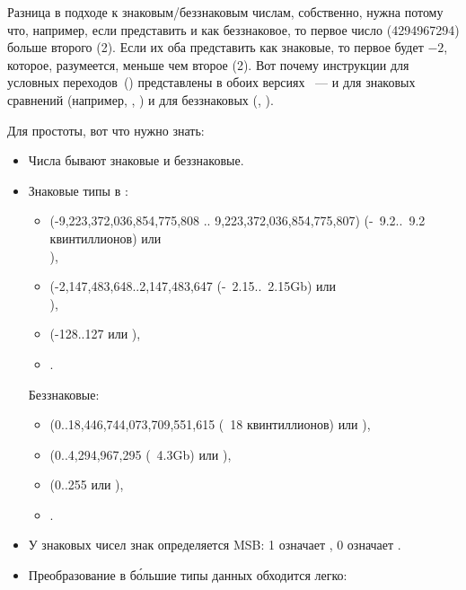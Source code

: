 Разница в подходе к знаковым/беззнаковым числам, собственно, нужна потому что, например, 
если представить  и  как беззнаковое, то первое число (4294967294) больше второго (2). 
Если их оба представить как знаковые, то первое будет $-2$, которое, разумеется, меньше чем второе (2).
Вот почему инструкции для условных переходов~() представлены в обоих версиях ~--- 
и для знаковых сравнений (например, \JG, \JL) и для беззнаковых (\JA, \JB).

Для простоты, вот что нужно знать:

\begin{itemize}
\item Числа бывают знаковые и беззнаковые.

\item Знаковые типы в \CCpp:

  \begin{itemize}
    \item {} (-9,223,372,036,854,775,808 .. 9,223,372,036,854,775,807) 
	  (-~9.2..~9.2 квинтиллионов) или \\
                ),
    \item \Tint (-2,147,483,648..2,147,483,647 (-~2.15..~2.15Gb) или \\
	    ),
    \item \Tchar (-128..127 или ),
    \item {}.
   \end{itemize}

	Беззнаковые:
  \begin{itemize}
	  \item {} (0..18,446,744,073,709,551,615 
		  (~18 квинтиллионов) или ),
   \item {} (0..4,294,967,295 (~4.3Gb) или ),
   \item {} (0..255 или ), 
   \item {}.
  \end{itemize}

\item У знаковых чисел знак определяется \ac{MSB}: 1 означает , 0 означает .

\item Преобразование в б\'{о}льшие типы данных обходится легко:


\end{itemize}
